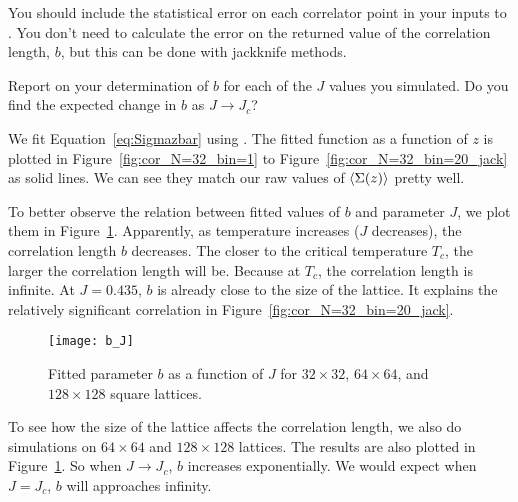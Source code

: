 You should include the statistical error on each correlator point in your inputs to
.
You don't need to calculate the error on the returned value of the correlation length,
\(b\), but this can be done with jackknife methods.

Report on your determination of \(b\) for each of the \(J\) values you
simulated. Do you find the expected change in \(b\) as \(J \rightarrow J_c\)?

\Answer{}
We fit Equation~\eqref{eq:Sigmazbar} using .
The fitted function as a function of \(z\) is plotted in Figure~\ref{fig:cor_N=32_bin=1}
to Figure~\ref{fig:cor_N=32_bin=20_jack} as solid lines.
We can see they match our raw values of \(\expval{\Sigma(z)}\) pretty well.

To better observe the relation between fitted values of \(b\) and parameter \(J\),
we plot them in Figure~\ref{fig:b_J}.
Apparently, as temperature increases (\(J\) decreases), the correlation length \(b\)
decreases. The closer to the critical temperature \(T_c\), the larger the correlation
length will be. Because at \(T_c\), the correlation length is infinite.
At \(J = 0.435\), \(b\) is already close to the size of the lattice.
It explains the relatively significant correlation in Figure~\ref{fig:cor_N=32_bin=20_jack}.

\begin{figure}[hb]
    \centering
    \texttt{[image: b\_J]}
    \caption{Fitted parameter \(b\) as a function of \(J\) for \(32 \times 32\),
        \(64 \times 64\), and \(128 \times 128\) square lattices.}
    \label{fig:b_J}
\end{figure}

To see how the size of the lattice affects the correlation length, we also do simulations
on \(64 \times 64\) and \(128 \times 128\) lattices.
The results are also plotted in Figure~\ref{fig:b_J}.
So when \(J \to J_c\), \(b\) increases exponentially. We would expect
when \(J = J_c\), \(b\) will approaches infinity.
